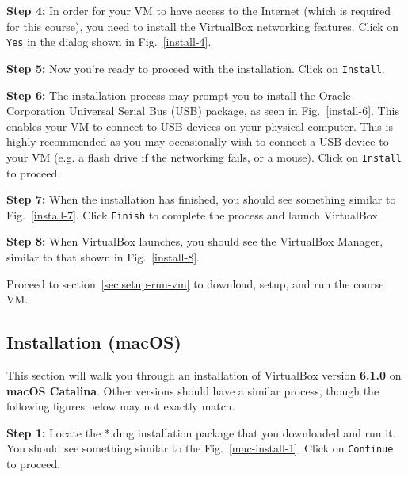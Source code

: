 \documentclass[11pt]{article}
\begin{document}
\textbf{Step 4:} In order for your VM to have access to the Internet (which is required for this course), you need to install the VirtualBox networking features. Click on \texttt{Yes} in the dialog shown in Fig.~\ref{install-4}.


\textbf{Step 5:} Now you're ready to proceed with the installation. Click on \texttt{Install}.

\textbf{Step 6:} The installation process may prompt you to install the Oracle Corporation Universal Serial Bus (USB) package, as seen in Fig.~\ref{install-6}. This enables your VM to connect to USB devices on your physical computer. This is highly recommended as you may occasionally wish to connect a USB device to your VM (e.g. a flash drive if the networking fails, or a mouse). Click on \texttt{Install} to proceed.

\textbf{Step 7:} When the installation has finished, you should see something similar to Fig.~\ref{install-7}. Click \texttt{Finish} to complete the process and launch VirtualBox.

\textbf{Step 8:} When VirtualBox launches, you should see the VirtualBox Manager, similar to that shown in Fig.~\ref{install-8}.

Proceed to section~\ref{sec:setup-run-vm} to download, setup, and run the course VM.


\subsection{Installation (macOS)}
\label{subsec:install-osx}
This section will walk you through an installation of VirtualBox version \textbf{6.1.0} on \textbf{macOS Catalina}. Other versions should have a similar process, though the following figures below may not exactly match.

\textbf{Step 1:} Locate the *.dmg installation package that you downloaded and run it. You should see something similar to the Fig.~\ref{mac-install-1}. Click on \texttt{Continue} to proceed.
\end{document}
